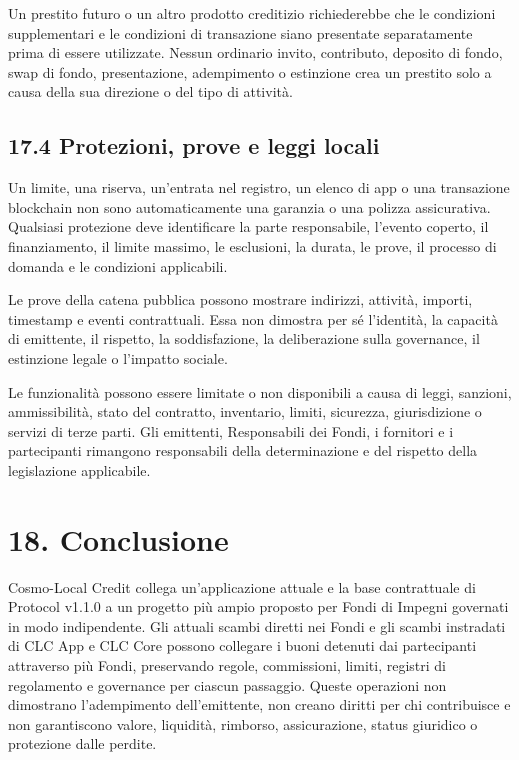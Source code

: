 \documentclass[11pt]{article}
\begin{document}
Un prestito futuro o un altro prodotto creditizio richiederebbe che le condizioni supplementari e le condizioni di transazione siano presentate separatamente prima di essere utilizzate. Nessun ordinario invito, contributo, deposito di fondo, swap di fondo, presentazione, adempimento o estinzione crea un prestito solo a causa della sua direzione o del tipo di attività.

\subsection*{17.4 Protezioni, prove e leggi locali}

Un limite, una riserva, un'entrata nel registro, un elenco di app o una transazione blockchain non sono automaticamente una garanzia o una polizza assicurativa. Qualsiasi protezione deve identificare la parte responsabile, l'evento coperto, il finanziamento, il limite massimo, le esclusioni, la durata, le prove, il processo di domanda e le condizioni applicabili.

Le prove della catena pubblica possono mostrare indirizzi, attività, importi, timestamp e eventi contrattuali. Essa non dimostra per sé l'identità, la capacità di emittente, il rispetto, la soddisfazione, la deliberazione sulla governance, il estinzione legale o l'impatto sociale.

Le funzionalità possono essere limitate o non disponibili a causa di leggi, sanzioni, ammissibilità, stato del contratto, inventario, limiti, sicurezza, giurisdizione o servizi di terze parti. Gli emittenti, Responsabili dei Fondi, i fornitori e i partecipanti rimangono responsabili della determinazione e del rispetto della legislazione applicabile.


\section*{18. Conclusione}

Cosmo-Local Credit collega un'applicazione attuale e la base contrattuale di Protocol v1.1.0 a un progetto più ampio proposto per Fondi di Impegni governati in modo indipendente. Gli attuali scambi diretti nei Fondi e gli scambi instradati di CLC App e CLC Core possono collegare i buoni detenuti dai partecipanti attraverso più Fondi, preservando regole, commissioni, limiti, registri di regolamento e governance per ciascun passaggio. Queste operazioni non dimostrano l'adempimento dell'emittente, non creano diritti per chi contribuisce e non garantiscono valore, liquidità, rimborso, assicurazione, status giuridico o protezione dalle perdite.
\end{document}

